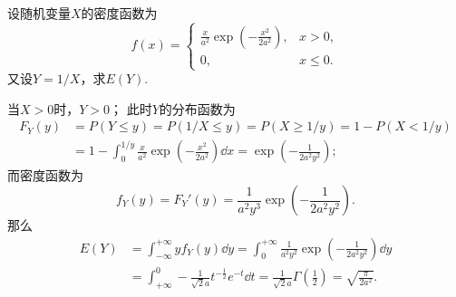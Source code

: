 \begin{example}
设随机变量\(X\)的密度函数为\[
	f(x) = \left\{ \begin{array}{cl}
		\frac{x}{a^2} \exp(-\frac{x^2}{2a^2}), & x>0, \\
		0, & x \leq 0.
	\end{array} \right.
\]
又设\(Y = 1/X\)，求\(E(Y)\).
\begin{solution}
当\(X>0\)时，\(Y>0\)；
此时\(Y\)的分布函数为\[\begin{aligned}
	F_Y(y)
	&= P(Y \leq y)
	= P(1/X \leq y)
	= P(X \geq 1/y)
	= 1 - P(X < 1/y) \\
	&= 1 - \int_0^{1/y} \frac{x}{a^2} \exp(-\frac{x^2}{2a^2}) \dd{x}
	= \exp(-\frac{1}{2a^2y^2});
\end{aligned}\]
而密度函数为\[
	f_Y(y) = F_Y'(y)
	= \frac{1}{a^2 y^3} \exp(-\frac{1}{2a^2y^2}).
\]
那么\begin{align*}
	E(Y)
	&= \int_{-\infty}^{+\infty} y f_Y(y) \dd{y}
	= \int_0^{+\infty} \frac{1}{a^2 y^2} \exp(-\frac{1}{2a^2y^2}) \dd{y} \\
	&= \int_{+\infty}^0 -\frac{1}{\sqrt{2} a} t^{-\frac{1}{2}} e^{-t} \dd{t}
	= \frac{1}{\sqrt{2} a} \Gamma\left(\frac{1}{2}\right)
	= \sqrt{\frac{\pi}{2a^2}}.
\end{align*}
\end{solution}
\end{example}

